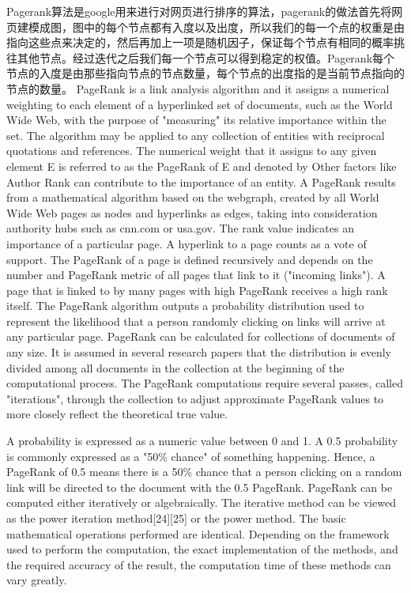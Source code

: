 \documentclass[master]{njuthesis}
\begin{document}
Pagerank算法是google用来进行对网页进行排序的算法，pagerank的做法首先将网页建模成图，图中的每个节点都有入度以及出度，所以我们的每一个点的权重是由指向这些点来决定的，然后再加上一项是随机因子，保证每个节点有相同的概率挑往其他节点。经过迭代之后我们每一个节点可以得到稳定的权值。Pagerank每个节点的入度是由那些指向节点的节点数量，每个节点的出度指的是当前节点指向的节点的数量。
PageRank is a link analysis algorithm and it assigns a numerical weighting to each element of a hyperlinked set of documents, such as the World Wide Web, with the purpose of "measuring" its relative importance within the set. The algorithm may be applied to any collection of entities with reciprocal quotations and references. The numerical weight that it assigns to any given element E is referred to as the PageRank of E and denoted by  Other factors like Author Rank can contribute to the importance of an entity.
A PageRank results from a mathematical algorithm based on the webgraph, created by all World Wide Web pages as nodes and hyperlinks as edges, taking into consideration authority hubs such as cnn.com or usa.gov. The rank value indicates an importance of a particular page. A hyperlink to a page counts as a vote of support. The PageRank of a page is defined recursively and depends on the number and PageRank metric of all pages that link to it ("incoming links"). A page that is linked to by many pages with high PageRank receives a high rank itself.
The PageRank algorithm outputs a probability distribution used to represent the likelihood that a person randomly clicking on links will arrive at any particular page. PageRank can be calculated for collections of documents of any size. It is assumed in several research papers that the distribution is evenly divided among all documents in the collection at the beginning of the computational process. The PageRank computations require several passes, called "iterations", through the collection to adjust approximate PageRank values to more closely reflect the theoretical true value.

A probability is expressed as a numeric value between 0 and 1. A 0.5 probability is
commonly expressed as a "50\% chance" of something happening. Hence, a PageRank of 0.5 means there is a 50\% chance that a person clicking on a random link will be directed to the document with the 0.5 PageRank.
PageRank can be computed either iteratively or algebraically. The iterative method can be viewed as the power iteration method[24][25] or the power method. The basic mathematical operations performed are identical.
Depending on the framework used to perform the computation, the exact implementation of the methods, and the required accuracy of the result, the computation time of these methods can vary greatly.
\end{document}
